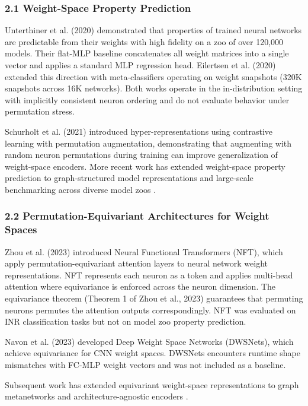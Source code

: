 
\subsubsection{2.1 Weight-Space Property Prediction}

Unterthiner et al. (2020) demonstrated that properties of trained neural networks are predictable from their weights with high fidelity on a zoo of over 120,000 models. Their flat-MLP baseline concatenates all weight matrices into a single vector and applies a standard MLP regression head. Eilertsen et al. (2020) extended this direction with meta-classifiers operating on weight snapshots (320K snapshots across 16K networks). Both works operate in the in-distribution setting with implicitly consistent neuron ordering and do not evaluate behavior under permutation stress.

Schurholt et al. (2021) introduced hyper-representations using contrastive learning with permutation augmentation, demonstrating that augmenting with random neuron permutations during training can improve generalization of weight-space encoders. More recent work has extended weight-space property prediction to graph-structured model representations \citep{WSKAN2026} and large-scale benchmarking across diverse model zoos \citep{Schurholt2025}.

\subsubsection{2.2 Permutation-Equivariant Architectures for Weight Spaces}

Zhou et al. (2023) introduced Neural Functional Transformers (NFT), which apply permutation-equivariant attention layers to neural network weight representations. NFT represents each neuron as a token and applies multi-head attention where equivariance is enforced across the neuron dimension. The equivariance theorem (Theorem 1 of Zhou et al., 2023) guarantees that permuting neurons permutes the attention outputs correspondingly. NFT was evaluated on INR classification tasks but not on model zoo property prediction.

Navon et al. (2023) developed Deep Weight Space Networks (DWSNets), which achieve equivariance for CNN weight spaces. DWSNets encounters runtime shape mismatches with FC-MLP weight vectors and was not included as a baseline.

Subsequent work has extended equivariant weight-space representations to graph metanetworks \citep{Kofinas2024} and architecture-agnostic encoders \citep{NNiT2026}.

